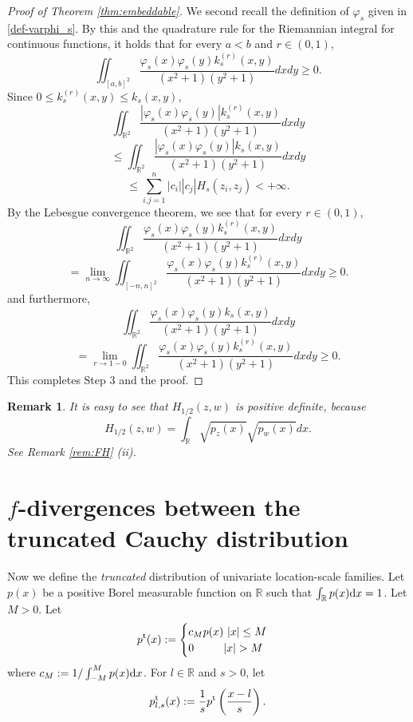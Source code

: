 \documentclass[journal]{IEEEtran}
\newtheorem{remark}[theorem]{Remark}
\begin{document}
\begin{proof}[Proof of Theorem \ref{thm:embeddable}]
We second recall the definition of $\varphi_s$ given in \eqref{def-varphi_s}.  
By this and the quadrature rule for the Riemannian integral for continuous functions, 
it holds that for every $a < b$ and $r \in (0,1)$, 
 \[ \iint_{[a,b]^2} \frac{\varphi_s (x) \varphi_s (y) k^{(r)}_s (x,y)}{(x^2 + 1)(y^2 + 1)} dxdy \ge 0. \]
Since $0 \le k^{(r)}_s (x,y) \le k_s (x,y)$, 
 \[ \iint_{\mathbb R^2} \frac{   |\varphi_s (x) \varphi_s (y)|  k^{(r)}_s (x,y)}{(x^2 + 1)(y^2 + 1)} dxdy \]
 \[\le \iint_{\mathbb R^2} \frac{   |\varphi_s (x) \varphi_s (y)|  k_s (x,y)}{(x^2 + 1)(y^2 + 1)} dxdy \]
 \[\le \sum_{i.j=1}^{n} |c_i| |c_j| H_s (z_i, z_j) < + \infty.  \]
By the Lebesgue convergence theorem,  
we see that for every $r \in (0,1)$, 
 \[ \iint_{\mathbb R^2}  \frac{  \varphi_s (x) \varphi_s (y)  k^{(r)}_s (x,y)}{(x^2 + 1)(y^2 + 1)} dxdy \]
 \[= \lim_{n \to \infty} \iint_{[-n,n]^2} \frac{\varphi_s (x) \varphi_s (y) k^{(r)}_s (x,y)}{(x^2 + 1)(y^2 + 1)} dxdy \ge 0. \]
and furthermore, 
 \[ \iint_{\mathbb R^2}  \frac{  \varphi_s (x) \varphi_s (y)  k_s (x,y)}{(x^2 + 1)(y^2 + 1)} dxdy \]
 \[= \lim_{r \to 1-0} \iint_{\mathbb R^2}  \frac{  \varphi_s (x) \varphi_s (y)  k^{(r)}_s (x,y)}{(x^2 + 1)(y^2 + 1)} dxdy \ge 0. \]
This completes Step 3 and the proof.  
\end{proof}

\begin{remark}
It is easy to see that $H_{1/2} (z,w)$ is positive definite, because 
\[ H_{1/2} (z,w) = \int_{\mathbb R} \sqrt{p_{z}(x)} \sqrt{p_w (x)} dx. \]
See Remark \ref{rem:FH} (ii). 
\end{remark}

\section{$f$-divergences between the truncated Cauchy distribution}\label{sec:truncated}
 

Now we define the {\it truncated} distribution of univariate location-scale families. 
Let $p(x)$ be a positive Borel measurable function on $\mathbb{R}$ such that $\int_{{\mathbb{R}}} p(x) \mathrm{d}x = 1$. 
Let $M > 0$. 
Let 
\[ p^{\textup{t}}(x) := \begin{cases} c_M p(x) \ |x| \le M \\ 0 \ \ \ \  \ \ \ \  |x| > M \end{cases} \]
where $c_M := 1/\int_{-M}^{M} p(x) \mathrm{d}x$. 
For $l \in \mathbb{R}$ and $s > 0$, 
let 
\[ p^{\textup{t}}_{l,s}(x) := \frac{1}{s} p^{\textup{t}}\left(\frac{x-l}{s}\right).  \]
\end{document}

